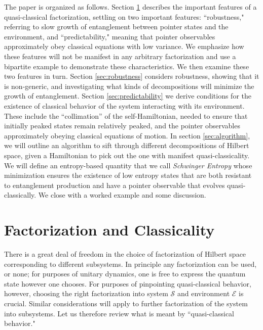 \documentclass[aps,pra,onecolumn,nofootinbib,notitlepage,11pt,tightenlines]{revtex4-1}
\begin{document}
The paper is organized as follows. Section \ref{sec:qc_factorization} describes the important features of a quasi-classical factorization, settling on two important features: ``robustness," referring to slow growth of entanglement between pointer states and the environment, and ``predictability," meaning that pointer observables approximately obey classical equations with low variance.
We emphasize how these features will not be manifest in any arbitrary factorization and use a bipartite example to demonstrate these characteristics.
We then examine these two features in turn.
Section \ref{sec:robustness} considers robustness, showing that it is non-generic, and investigating what kinds of decompositions will minimize the growth of entanglement.
Section \ref{sec:predictability} we derive conditions for the existence of classical behavior of the system interacting with its environment.
These include the ``collimation'' of the self-Hamiltonian, needed to ensure that initially peaked states remain relatively peaked, and the pointer observables approximately obeying classical equations of motion.
In section \ref{sec:algorithm}, we will outline an algorithm to sift through different decompositions of Hilbert space, given a Hamiltonian to pick out the one with manifest quasi-classicality. We will define an entropy-based quantity that we call \emph{Schwinger Entropy} whose minimization ensures the existence of low entropy states that are both resistant to entanglement production and have a pointer observable that evolves quasi-classically.
We close with a worked example and some discussion.


\section{Factorization and Classicality}
\label{sec:qc_factorization}


There is a great deal of freedom in the choice of factorization of Hilbert space corresponding to different subsystems.
In principle any factorization can be used, or none; for purposes of unitary dynamics, one is free to express the quantum state however one chooses.
For purposes of pinpointing quasi-classical behavior, however, choosing the right factorization into system $\mathcal{S}$ and environment $\mathcal{E}$ is crucial.
Similar considerations will apply to further factorization of the system into subsystems.
Let us therefore review what is meant by ``quasi-classical behavior."
\end{document}
